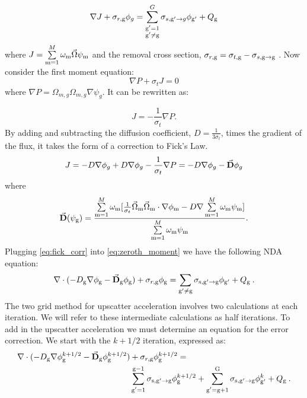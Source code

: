   \begin{equation}
  \nabla J + \sigma_{r,\mathrm{g}}\phi_g  = \sum_{\substack{\mathrm{g}'=1 \\ \mathrm{g}' \neq \mathrm{g}}}^G \sigma_{s,\mathrm{g}' \rightarrow g}\phi_{\mathrm{g}'} + Q_{\mathrm{g}}
  \label{eq:zeroth_moment}
  \end{equation}
where $J = \sum\limits_{\mathrm{m}=1}^{M}\omega_{\mathrm{m}} \vec{\Omega}\psi_{\mathrm{m}}$ and the removal cross section, $\sigma_{r, \mathrm{g}} = \sigma_{t, \mathrm{g}} - \sigma_{s, \mathrm{g} \rightarrow \mathrm{g}}$ . 
  Now consider the first moment equation:
  \begin{equation}
  \nabla P + \sigma_t J = 0
  \end{equation}
where $\nabla P =  \Omega_{m,g} \Omega_{m,g} \nabla \psi_{g}$. It can be rewritten as: 

  \begin{equation}
  J= -\frac{1}{\sigma_t} \nabla P. 
  \end{equation}
  By adding and subtracting the diffusion coefficient, $D = \frac{1}{3\sigma_t}$, times the gradient of the flux, it takes the form of a correction to Fick's Law. 
  \begin{equation}
  J = -D \nabla \phi_g + D \nabla \phi_g - \frac{1}{\sigma_t} \nabla P \\
  = -D \nabla \phi_g - \vec{\textbf{D}} \phi_g
  \label{eq:fick_corr}
  \end{equation}
  where 
 \begin{equation}
  \vec{\textbf{D}} (\psi_{\mathrm{g}}) = \frac{\sum\limits_{\mathrm{m}=1}^M \omega_{\mathrm{m}} [\frac{1}{\sigma_t} \vec{\Omega}_{\mathrm{m}} \vec{\Omega}_{\mathrm{m}} \cdot \nabla\phi_{\mathrm{m}} - D \nabla \sum\limits_{\mathrm{m}=1}^M \omega_{\mathrm{m}}\psi_{\mathrm{m}}]}{\sum\limits_{\mathrm{m}=1}^M \omega_{\mathrm{m}} \psi_{\mathrm{m}}}.
  \end{equation} 
 Plugging \ref{eq:fick_corr} into \ref{eq:zeroth_moment} we have the following NDA equation:
  \begin{equation}
  \nabla\cdot(-D_{\mathrm{g}} \nabla \phi_{\mathrm{g}} - \vec{\bf D}_{\mathrm{g}} \phi_{\mathrm{g}}) + \sigma_{r,\mathrm{g}} \phi_{\mathrm{g}} = \sum\limits_{{\mathrm{g}'}\neq\mathrm{g}}\sigma_{\mathrm{s},\mathrm{g}' \rightarrow \mathrm{g}}\phi_{\mathrm{g}'} + Q_{\mathrm{g}} \:. \label{eq:NDA}
  \end{equation}
  The two grid method for upscatter acceleration involves two calculations at each iteration. We will refer to these intermediate calculations as half iterations. To add in the upscatter acceleration we must determine an equation for the error correction. We start with the $k + 1/2$ iteration, expressed as:
  \begin{equation}
  \begin{split}
  \nabla\cdot(-D_{\mathrm{g}} \nabla \phi_{\mathrm{g}}^{k+1/2} - \vec{\bf D}_{\mathrm{g}} \phi_{\mathrm{g}}^{k+1/2}) &+ \sigma_{r,\mathrm{g}} \phi_{\mathrm{g}}^{k+1/2} =  \\ &\sum\limits_{\substack{\mathrm{g}'=1}}^{\mathrm{g-1}} \sigma_{\mathrm{s},\mathrm{g}' \to\mathrm{g}}\phi_{\mathrm{g}}^{k+1/2} + \sum\limits_{\substack{\mathrm{g}'=\mathrm{g}+1}}^{\mathrm{G}} \sigma_{\mathrm{s},\mathrm{g}' \to\mathrm{g}}\phi_{\mathrm{g}'}^{k} + Q_{\mathrm{g}}\:. 
  \end{split}
  \label{eq:k1/2}
  \end{equation}
